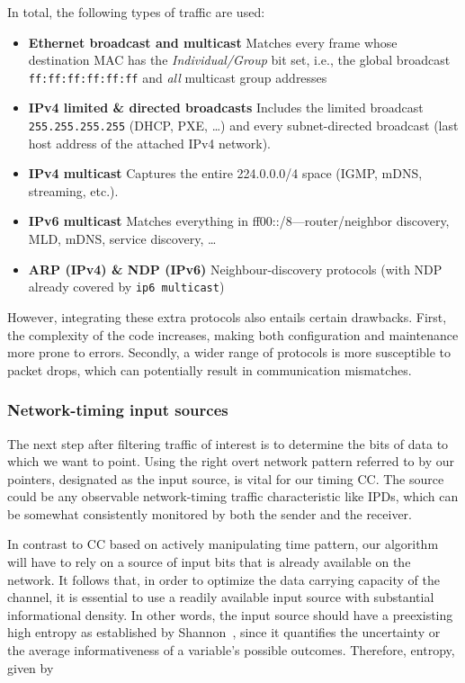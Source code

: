 \documentclass[journal]{IEEEtran}
\begin{document}
In total, the following types of traffic are used:

\begin{itemize}
  \item \textbf{Ethernet broadcast and multicast}  
        Matches every frame whose destination MAC has the \emph{Individual/Group} bit set, i.e., the global broadcast
        \texttt{ff:ff:ff:ff:ff:ff} and \emph{all} multicast group addresses

  \item \textbf{IPv4 limited \& directed broadcasts}  
        Includes the limited broadcast \texttt{255.255.255.255} (DHCP, PXE, …) and every subnet-directed broadcast
        (last host address of the attached IPv4 network).  

  \item \textbf{IPv4 multicast}  
        Captures the entire 224.0.0.0/4 space (IGMP, mDNS, streaming, etc.).  

  \item \textbf{IPv6 multicast}  
        Matches everything in ff00::/8—router/neighbor discovery, MLD, mDNS, service discovery, …  

  \item \textbf{ARP (IPv4) \& NDP (IPv6)}  
        Neighbour-discovery protocols (with NDP already covered by \texttt{ip6 multicast})\\
\end{itemize}

However, integrating these extra protocols also entails certain drawbacks. First, the complexity of the code increases, making both configuration and maintenance more prone to errors. Secondly, a wider range of protocols is more susceptible to packet drops, which can potentially result in communication mismatches.

\subsubsection{Network-timing input sources}
The next step after filtering traffic of interest is to determine the bits of data to which we want to point. Using the right overt network pattern referred to by our pointers, designated as the input source, is vital for our timing \ac{CC}. The source could be any observable network-timing traffic characteristic like \ac{IPD}s, which can be somewhat consistently monitored by both the sender and the receiver.

In contrast to \ac{CC} based on actively manipulating time pattern, our algorithm will have to rely on a source of input bits that is already available on the network. It follows that, in order to optimize the data carrying capacity of the channel, it is essential to use a readily available input source with substantial informational density. In other words, the input source should have a preexisting high entropy as established by Shannon~\cite{shannon48}, since it quantifies the uncertainty or the average informativeness of a variable's possible outcomes. Therefore, entropy, given by
\end{document}

